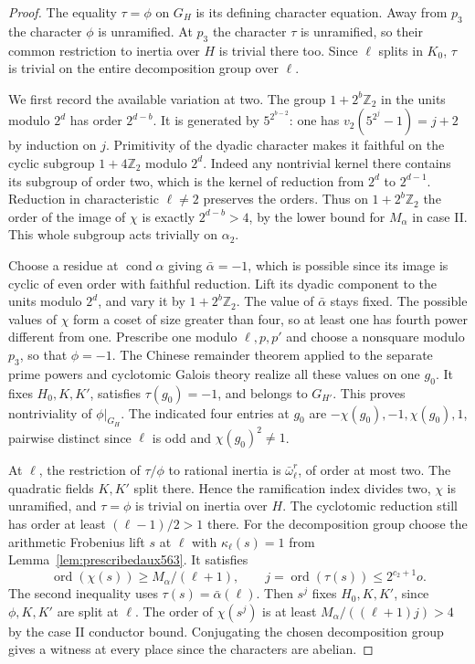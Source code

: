 \documentclass[a4paper,11pt]{article}
\theoremstyle{definition}
\theoremstyle{remark}
\newcommand{\ZZ}{\mathbb Z}\newcommand{\ord}{\operatorname{ord}}
\numberwithin{equation}{section}
\begin{document}
\begin{proof}
The equality \(\tau=\phi\) on \(G_H\) is its defining
character equation. Away from \(p_3\) the character \(\phi\)
is unramified. At \(p_3\) the character \(\tau\) is unramified,
so their common restriction to inertia over \(H\) is trivial
there too. Since \(\ell\) splits in \(K_0\), \(\tau\) is
trivial on the entire decomposition group over \(\ell\).

We first record the available variation at two. The group
\(1+2^b\ZZ_2\) in the units modulo \(2^d\) has order
\(2^{d-b}\). It is generated by \(5^{2^{b-2}}\):
one has \(v_2(5^{2^j}-1)=j+2\) by induction on \(j\).
Primitivity of the dyadic character makes it faithful on
the cyclic subgroup \(1+4\ZZ_2\) modulo \(2^d\).
Indeed any nontrivial kernel there contains its subgroup
of order two, which is the kernel of reduction from
\(2^d\) to \(2^{d-1}\). Reduction in characteristic
\(\ell\ne2\) preserves the orders. Thus on \(1+2^b\ZZ_2\)
the order of the image of \(\chi\) is exactly \(2^{d-b}>4\),
by the lower bound for \(M_\alpha\) in case II.
This whole subgroup acts trivially on \(\alpha_2\).

Choose a residue at \(\operatorname{cond}\alpha\) giving
\(\bar\alpha=-1\), which is possible since its image is cyclic
of even order with faithful reduction. Lift its dyadic component
to the units modulo \(2^d\), and vary it by \(1+2^b\ZZ_2\).
The value of \(\bar\alpha\) stays fixed. The possible values
of \(\chi\) form a coset of size greater than four, so at
least one has fourth power different from one. Prescribe
one modulo \(\ell,p,p'\) and choose a nonsquare modulo
\(p_3\), so that \(\phi=-1\). The Chinese remainder theorem
applied to the separate prime powers and cyclotomic Galois
theory realize all these values on one \(g_0\). It fixes
\(H_0,K,K'\), satisfies \(\tau(g_0)=-1\), and belongs to
\(G_{H'}\). This proves nontriviality of \(\phi|_{G_H}\).
The indicated four entries at \(g_0\) are
\(-\chi(g_0),-1,\chi(g_0),1\), pairwise distinct since
\(\ell\) is odd and \(\chi(g_0)^2\ne1\).

At \(\ell\), the restriction of \(\tau/\phi\) to rational
inertia is \(\bar\omega_\ell^r\), of order at most two.
The quadratic fields \(K,K'\) split there. Hence the
ramification index divides two, \(\chi\) is unramified,
and \(\tau=\phi\) is trivial on inertia over \(H\).
The cyclotomic reduction still has order at least
\((\ell-1)/2>1\) there. For the decomposition group choose
the arithmetic Frobenius lift \(s\) at \(\ell\) with
\(\kappa_\ell(s)=1\) from Lemma~\ref{lem:prescribedaux563}.
It satisfies
\[
       \operatorname{ord}(\chi(s))\ge M_\alpha/(\ell+1),
       \qquad j=\operatorname{ord}(\tau(s))\le 2^{c_2+1}o .
\]
The second inequality uses \(\tau(s)=\bar\alpha(\ell)\).
Then \(s^j\) fixes \(H_0,K,K'\), since \(\phi,K,K'\)
are split at \(\ell\). The order of \(\chi(s^j)\) is
at least \(M_\alpha/((\ell+1)j)>4\) by the case II
conductor bound. Conjugating the chosen decomposition
group gives a witness at every place since the characters
are abelian.


\end{proof}
\end{document}
